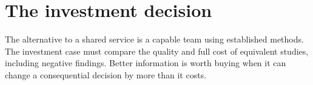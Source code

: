 \documentclass[11pt,a4paper,openany]{book}
\begin{document}
\part{The investment decision}
\label{reading:part-investment}
The alternative to a shared service is a capable team using established
methods. The investment case must compare the quality and full cost of
equivalent studies, including negative findings. Better information is worth
buying when it can change a consequential decision by more than it costs.



\backmatter
\clearpage{}
{}


\end{document}
